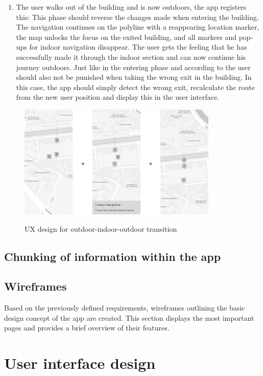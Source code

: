 \begin{enumerate}
    \item The user walks out of the building and is now outdoors, the app registers this: This phase should reverse the changes made when entering the building. The navigation continues on the polyline with a reappearing location marker, the map unlocks the focus on the exited building, and all markers and pop-ups for indoor navigation disappear. The user gets the feeling that he has successfully made it through the indoor section and can now continue his journey outdoors. Just like in the entering phase and according to \cite{postels_law} the user should also not be punished when taking the wrong exit in the building. In this case, the app should simply detect the wrong exit, recalculate the route from the new user position and display this in the user interface.
\end{enumerate}

\begin{figure}[H]
	\centering
	\includegraphics[width=0.85\textwidth]{images/indoor_navigation_phases.png}\\
	\caption{UX design for outdoor-indoor-outdoor transition}
\end{figure}

\subsection{Chunking of information within the app}

\subsection{Wireframes}
Based on the previously defined requirements, wireframes outlining the basic design concept of the app are created. This section displays the most important pages and provides a brief overview of their features.

\section{User interface design}